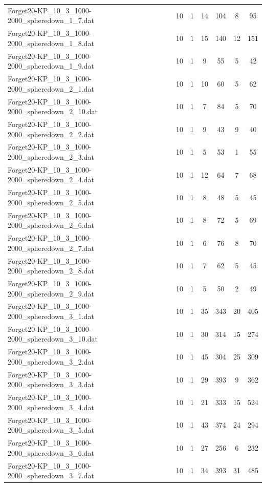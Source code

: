 \begin{table}[!ht]
\begin{tabular}{lcccccc}
Forget20-KP\_10\_3\_1000-2000\_spheredown\_1\_7.dat & 10 & 1 & 14 & 104 & 8 & 95 \\
Forget20-KP\_10\_3\_1000-2000\_spheredown\_1\_8.dat & 10 & 1 & 15 & 140 & 12 & 151 \\
Forget20-KP\_10\_3\_1000-2000\_spheredown\_1\_9.dat & 10 & 1 & 9 & 55 & 5 & 42 \\
Forget20-KP\_10\_3\_1000-2000\_spheredown\_2\_1.dat & 10 & 1 & 10 & 60 & 5 & 62 \\
Forget20-KP\_10\_3\_1000-2000\_spheredown\_2\_10.dat & 10 & 1 & 7 & 84 & 5 & 70 \\
Forget20-KP\_10\_3\_1000-2000\_spheredown\_2\_2.dat & 10 & 1 & 9 & 43 & 9 & 40 \\
Forget20-KP\_10\_3\_1000-2000\_spheredown\_2\_3.dat & 10 & 1 & 5 & 53 & 1 & 55 \\
Forget20-KP\_10\_3\_1000-2000\_spheredown\_2\_4.dat & 10 & 1 & 12 & 64 & 7 & 68 \\
Forget20-KP\_10\_3\_1000-2000\_spheredown\_2\_5.dat & 10 & 1 & 8 & 48 & 5 & 45 \\
Forget20-KP\_10\_3\_1000-2000\_spheredown\_2\_6.dat & 10 & 1 & 8 & 72 & 5 & 69 \\
Forget20-KP\_10\_3\_1000-2000\_spheredown\_2\_7.dat & 10 & 1 & 6 & 76 & 8 & 70 \\
Forget20-KP\_10\_3\_1000-2000\_spheredown\_2\_8.dat & 10 & 1 & 7 & 62 & 5 & 45 \\
Forget20-KP\_10\_3\_1000-2000\_spheredown\_2\_9.dat & 10 & 1 & 5 & 50 & 2 & 49 \\
Forget20-KP\_10\_3\_1000-2000\_spheredown\_3\_1.dat & 10 & 1 & 35 & 343 & 20 & 405 \\
Forget20-KP\_10\_3\_1000-2000\_spheredown\_3\_10.dat & 10 & 1 & 30 & 314 & 15 & 274 \\
Forget20-KP\_10\_3\_1000-2000\_spheredown\_3\_2.dat & 10 & 1 & 45 & 304 & 25 & 309 \\
Forget20-KP\_10\_3\_1000-2000\_spheredown\_3\_3.dat & 10 & 1 & 29 & 393 & 9 & 362 \\
Forget20-KP\_10\_3\_1000-2000\_spheredown\_3\_4.dat & 10 & 1 & 21 & 333 & 15 & 524 \\
Forget20-KP\_10\_3\_1000-2000\_spheredown\_3\_5.dat & 10 & 1 & 43 & 374 & 24 & 294 \\
Forget20-KP\_10\_3\_1000-2000\_spheredown\_3\_6.dat & 10 & 1 & 27 & 256 & 6 & 232 \\
Forget20-KP\_10\_3\_1000-2000\_spheredown\_3\_7.dat & 10 & 1 & 34 & 393 & 31 & 485 \\

\end{tabular}
\end{table}
